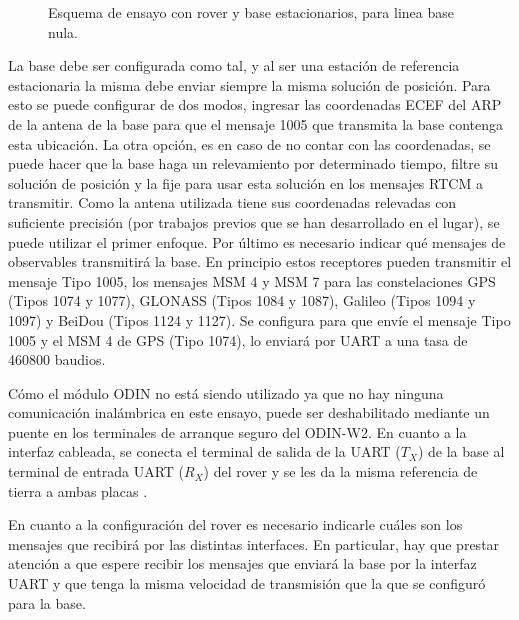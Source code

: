 \documentclass[a4paper,12pt,oneside,onecolumn,final,openright]{book}%
\begin{document}
\begin{figure}
\centering
{}
\centering
{}
\caption{Esquema de ensayo con rover y base estacionarios, para linea base nula.}
\label{fig:EnsayoZBL}
\end{figure}

	La base debe ser configurada como tal, y al ser una estación de referencia estacionaria la misma debe enviar siempre la misma solución de posición. Para esto se puede configurar de dos modos, ingresar las coordenadas ECEF del ARP de la antena de la base para que el mensaje 1005 que transmita la base contenga esta ubicación. La otra opción, es en caso de no contar con las coordenadas, se puede hacer que la base haga un relevamiento por determinado tiempo, filtre su solución de posición y la fije para usar esta solución en los mensajes RTCM a transmitir. Como la antena utilizada tiene sus coordenadas relevadas con suficiente precisión (por trabajos previos que se han desarrollado en el lugar), se puede utilizar el primer enfoque. Por último es necesario indicar qué mensajes de observables transmitirá la base. En principio estos receptores pueden transmitir el mensaje Tipo 1005, los mensajes MSM 4 y MSM 7 para las constelaciones GPS (Tipos 1074 y 1077), GLONASS (Tipos 1084 y 1087), Galileo (Tipos 1094 y 1097) y BeiDou (Tipos 1124 y 1127). Se configura para que envíe el mensaje Tipo 1005 y el MSM 4 de GPS (Tipo 1074), lo enviará por UART a una tasa de 460800 baudios.
	
	Cómo el módulo ODIN no está siendo utilizado ya que no hay ninguna comunicación inalámbrica en este ensayo, puede ser deshabilitado mediante un puente en los terminales de arranque seguro del ODIN-W2. En cuanto a la interfaz cableada, se conecta el terminal de salida de la UART ($T_X$) de la base al terminal de entrada UART ($R_X$) del rover y se les da la misma referencia de tierra a ambas placas \cite{moving_base_AppN}.
	
	En cuanto a la configuración del rover es necesario indicarle cuáles son los mensajes que recibirá por las distintas interfaces. En particular, hay que prestar atención a que espere recibir los mensajes que enviará la base por la interfaz UART y que tenga la misma velocidad de transmisión que la que se configuró para la base.
\end{document}
